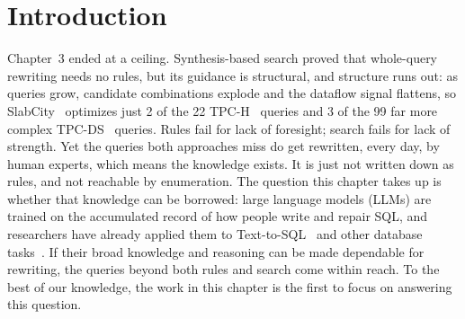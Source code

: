\section{Introduction}\label{gen:sec:intro}

Chapter~3 ended at a ceiling. Synthesis-based search proved that
whole-query rewriting needs no rules, but its guidance is structural,
and structure runs out: as queries grow, candidate combinations
explode and the dataflow signal flattens, so SlabCity~\cite{dong2023slabcity} optimizes
just 2 of the 22 TPC-H~\cite{tpch} queries and 3 of the 99 far more
complex TPC-DS~\cite{tpcds} queries. Rules fail for lack of foresight;
search fails for lack of strength. Yet the queries both approaches
miss do get rewritten, every day, by human experts, which means the
knowledge exists. It is just not written down as rules, and not
reachable by enumeration. The question this chapter takes up is
whether that knowledge can be borrowed: large language models (LLMs)
are trained on the accumulated record of how people write and repair
SQL, and researchers have already applied them to
Text-to-SQL~\cite{fu2023catsql,gao2023text,sun2306sql,katsogiannis2023survey,pourreza2024din}
and other database
tasks~\cite{narayan2022can,suhara2022annotating,li2023table,lu2024large,zhou2023d}.
If their broad knowledge and reasoning can be made dependable for
rewriting, the queries beyond both rules and search come within reach.
To the best of our knowledge, the work in this chapter is the first to
focus on answering this question.

